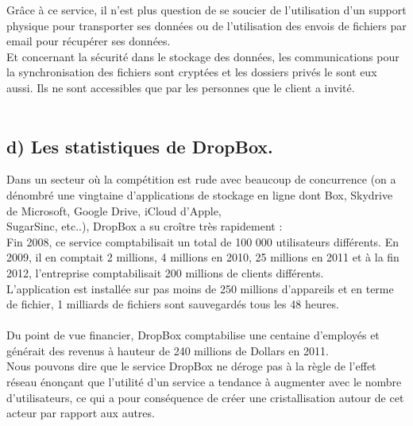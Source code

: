 \documentclass[a4paper, 10pt]{article}
\begin{document}
\newpage
\noindent
Grâce à ce service, il n'est plus question de se soucier de l'utilisation d'un support physique pour transporter ses données
ou de l'utilisation des envois de fichiers par email pour récupérer ses données.\\
Et concernant la sécurité dans le stockage des données, les communications pour la synchronisation des fichiers sont cryptées et
les dossiers privés le sont eux aussi. Ils ne sont accessibles que par les personnes que le client a invité.\\ \\

\subsection*{d) Les statistiques de DropBox.}
Dans un secteur où la compétition est rude avec beaucoup de concurrence
(on a dénombré une vingtaine d'applications de stockage en ligne dont Box, Skydrive de Microsoft, Google Drive, iCloud d'Apple,\\SugarSinc,
etc..), DropBox a su croître très rapidement :\\
Fin 2008, ce service comptabilisait un total de 100 000 utilisateurs différents.
En 2009, il en comptait 2 millions, 4 millions en 2010, 25 millions en 2011 et
à la fin 2012, l'entreprise comptabilisait 200 millions de clients différents.\\
L'application est installée sur pas moins de 250 millions d'appareils et
en terme de fichier, 1 milliards de fichiers sont sauvegardés tous les 48 heures.\\ \\
Du point de vue financier, DropBox comptabilise une centaine d'employés et générait des revenus à hauteur
de 240 millions de Dollars en 2011.\\
Nous pouvons dire que le service DropBox ne déroge pas à la règle de l'effet réseau énonçant que l'utilité d'un service
a tendance à augmenter avec le nombre d'utilisateurs, ce qui a pour conséquence de créer une cristallisation autour de cet acteur
par rapport aux autres.\\ \\
\end{document}
